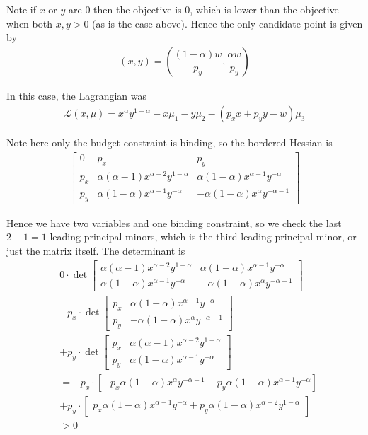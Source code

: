 \documentclass{article}
\begin{document}
Note if $x$ or $y$ are $0$ then the objective is $0$, which is lower than the objective when both $x, y > 0$ (as is the case above). Hence the only candidate point is given by
\begin{align*}
  (x, y)
  =
  \left(
  \dfrac{(1 - \alpha) w}{p_y}, \dfrac{\alpha w}{p_y}
  \right)
\end{align*}

In this case, the Lagrangian was
\begin{align*}
  \mathcal{L}(x, \mu)
  =
  x^\alpha y^{1 - \alpha}
  -
  x \mu_1
  -
  y \mu_2
  -
  (p_x x + p_y y - w) \mu_3
\end{align*}

Note here only the budget constraint is binding, so the bordered Hessian is
\begin{align*}
  \begin{bmatrix}
    0    & p_x & p_y \\
    p_x  & \alpha (\alpha - 1) x^{\alpha - 2} y^{1 - \alpha} & \alpha (1 - \alpha) x^{\alpha - 1} y^{- \alpha} \\
    p_y  & \alpha (1 - \alpha) x^{\alpha - 1} y^{- \alpha} & - \alpha (1 - \alpha) x^{\alpha} y^{-\alpha - 1}
  \end{bmatrix}
\end{align*}

Hence we have two variables and one binding constraint, so we check the last $2 - 1 = 1$ leading principal minors, which is the third leading principal minor, or just the matrix itself. The determinant is
\begin{align*}
  &
  0 \cdot \det
  \begin{bmatrix}
    \alpha (\alpha - 1) x^{\alpha - 2} y^{1 - \alpha} & \alpha (1 - \alpha) x^{\alpha - 1} y^{- \alpha} \\
    \alpha (1 - \alpha) x^{\alpha - 1} y^{- \alpha} & - \alpha (1 - \alpha) x^{\alpha} y^{-\alpha - 1}
  \end{bmatrix}
  \\
  &
  -
  p_x \cdot \det
  \begin{bmatrix}
    p_x  & \alpha (1 - \alpha) x^{\alpha - 1} y^{- \alpha} \\
    p_y  & - \alpha (1 - \alpha) x^{\alpha} y^{-\alpha - 1}
  \end{bmatrix}
  \\
  &
  +
  p_y \cdot \det
  \begin{bmatrix}
    p_x  & \alpha (\alpha - 1) x^{\alpha - 2} y^{1 - \alpha} \\
    p_y  & \alpha (1 - \alpha) x^{\alpha - 1} y^{- \alpha}
  \end{bmatrix}
  \\
  &
  =
  -
  p_x \cdot
  \left[
    - p_x \alpha (1 - \alpha) x^{\alpha} y^{-\alpha - 1}
    - p_y \alpha (1 - \alpha) x^{\alpha - 1} y^{- \alpha}
  \right]
  \\
  &
  +
  p_y \cdot
  \begin{bmatrix}
    p_x
    \alpha (1 - \alpha) x^{\alpha - 1} y^{- \alpha}
    +
    p_y
    \alpha (1 - \alpha) x^{\alpha - 2} y^{1 - \alpha}
  \end{bmatrix}
  \\
  &
  >
  0
\end{align*}
\end{document}

